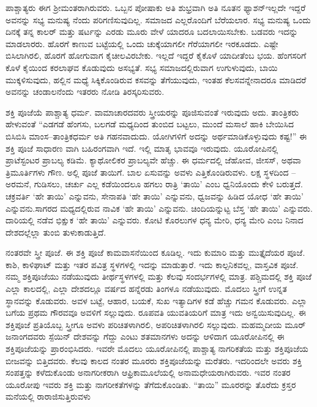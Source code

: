 ಪಾಶ್ಚಾತ್ಯರು ಈಗ ಶ‍್ರೀಮಂತರಾಗಿರುವರು. ಒಬ್ಬನ ಪೋಷಾಕು ಅತಿ ಶುಭ್ರವಾಗಿ ಅತಿ ನೂತನ ಫ್ಯಾಶನ್​ ಇಲ್ಲದೇ ಇದ್ದರೆ ಅವನನ್ನು ಸಭ್ಯ ಮನುಷ್ಯ ನೆಂದು ಪರಿಗಣಿಸುವುದಿಲ್ಲ. ಸಮಾಜದ ಎಲ್ಲರೊಂದಿಗೆ ಬೆರೆಯಲಾರ. ಸಭ್ಯ ಮನುಷ್ಯ ಒಂದು ದಿನಕ್ಕೆ ತನ್ನ ಕಾಲರ್​ ಮತ್ತು ಷರ್ಟನ್ನು ಎರಡು ಮೂರು ವೇಳೆ ಯಾದರೂ ಬದಲಾಯಿಸಬೇಕು. ಬಡವರು ಇದನ್ನು ಮಾಡಲಾರರು. ಹೊರಗೆ ಕಾಣುವ ಬಟ್ಟೆಯಲ್ಲಿ ಒಂದು ಚುಕ್ಕೆಯಾಗಲೀ ಗೆರೆ\break ಯಾಗಲೀ ಇರಕೂಡದು. ಎಷ್ಟೇ ಬಿಸಿಲಾಗಿರಲಿ, ಹೊರಗೆ ಹೋಗುವಾಗ ಕೈಚೀಲವಿರಬೇಕು. ಇಲ್ಲದೆ ಇದ್ದರೆ ಕೈಕೊಳೆ ಯಾದೀತೆಂಬ ಭಯ. ಹೆಂಗಸರಿಗೆ ಕೊಳೆ ಕೈಯಿಂದ ಕರಲಾಘವ ಕೊಡುವುದು ಅಸಭ್ಯತೆ. ಸಭ್ಯ ಸಮಾಜದಲ್ಲಿರುವಾಗ ಉಗುಳುವುದು, ಬಾಯಿ ಮುಕ್ಕಳಿಸು\break ವುದು, ಹಲ್ಲಿನ ಮಧ್ಯೆ ಸಿಕ್ಕಿಕೊಂಡಿರುವ ಕಸವನ್ನು ತೆಗೆಯುವುದು, ಇಂತಹ ಕೆಲಸವನ್ನೇ\break ನಾದರೂ ಮಾಡಿದರೆ ಅವನನ್ನು ಚಂಡಾಲನೆಂದು ಇತರರು ನೋಡಿ ತಿರಸ್ಕರಿಸುವರು.

ಶಕ್ತಿ ಪೂಜೆಯೆ ಪಾಶ್ಚಾತ್ಯ ಧರ್ಮ. ವಾಮಾಚಾರದವರು ಸ್ತ್ರೀಯರನ್ನು ಪೂಜಿಸುವಂತೆ ಇರುವುದು ಅದು. ತಾಂತ್ರಿಕರು ಹೇಳುವಂತೆ “ಎಡಗಡೆ ಹೆಂಗಸು, ಬಲಗಡೆ ಮಧ್ಯದಿಂದ ತುಂಬಿದ ಬಟ್ಟಲು, ಮುಂದೆ ಮಸಾಲೆ ಹಾಕಿ ಬೇಯಿಸಿದ ಬಿಸಿಬಿಸಿ ಮಾಂಸ–ತಾಂತ್ರಿಕಧರ್ಮ ಅತಿ ಗಹನವಾದುದು. ಯೋಗಿಗಳಿಗೆ ಅದನ್ನು ಅರ್ಥಮಾಡಿಕೊಳ್ಳುವುದು ಕಷ್ಟ!” ಈ ಶಕ್ತಿ ಪೂಜೆ ಸಾಧಾರಣ ವಾಗಿ ಬಹಿರಂಗವಾಗಿ ಇದೆ. ಇಲ್ಲಿ ಮಾತೃ ಭಾವವೂ ಇರುವುದು. ಯೂರೋಪಿನಲ್ಲಿ ಪ್ರಾಟೆಸ್ಟಂಟರ ಪ್ರಾಬಲ್ಯ ಕಡಿಮೆ. ಕ್ಯಾಥೋಲಿಕರ ಪ್ರಾಬಲ್ಯವೇ ಹೆಚ್ಚು. ಈ ಧರ್ಮದಲ್ಲಿ ಜೆಹೋವ, ಜೀಸಸ್​, ಅಥವಾ ತ್ರಿಮೂರ್ತಿಗಳು ಗೌಣ. ಅಲ್ಲಿ ಪೂಜೆ ತಾಯಿಗೆ. ಬಾಲ ಏಸುವನ್ನು ಅವಳು ಎತ್ತಿಕೊಂಡಿರುವಳು. ಲಕ್ಷ ಸ್ಥಳದಿಂದ – ಅರಮನೆ, ಗುಡಿಸಲು, ಚರ್ಚು ಎಲ್ಲ ಕಡೆಯಿಂದಲೂ ಹಗಲು ರಾತ್ರಿ ‘ತಾಯಿ’ ಎಂಬ ಧ್ವನಿಯೊಂದು ಕೇಳಿ ಬರುತ್ತದೆ. ಚಕ್ರವರ್ತಿ ‘ಹೇ ತಾಯಿ’ ಎನ್ನುವನು, ಸೇನಾಪತಿ ‘ಹೇ ತಾಯಿ’ ಎನ್ನುವನು, ಧ್ವಜವನ್ನು ಹಿಡಿದ ಯೋಧ ‘ಹೇ ತಾಯಿ’ ಎನ್ನುವನು.\break ಸಾಗರದ ಮಧ್ಯದಲ್ಲಿರುವ ನಾವಿಕ ‘ಹೇ ತಾಯಿ’ ಎನ್ನುವನು. ಚಿಂದಿಯನ್ನುಟ್ಟ ಬೆಸ್ತ `ಹೇ ತಾಯಿ’ ಎನ್ನುವರು. ದಾರಿಯಲ್ಲಿ ನಡೆವ ಭಿಕ್ಷುಕ `ಹೇ ತಾಯಿ’ ಎನ್ನುವರು. ಕೋಟಿ ಕೊರಲುಗಳ ಧನ್ಯ ಮೇರಿ, ಧನ್ಯ ಮೇರಿ ಎಂಬ ನಿನಾದ ದೇಶದಲ್ಲೆಲ್ಲಾ ತುಂಬಿ ತುಳುಕಾಡುತ್ತಿದೆ.

ನಂತರವೇ ಸ್ತ್ರೀ ಪೂಜೆ. ಈ ಶಕ್ತಿ ಪೂಜೆ ಕಾಮವಾಸನೆಯಿಂದ ಕೂಡಿಲ್ಲ. ಇದು ಕುಮಾರಿ ಮತ್ತು ಮುತ್ತೈದೆಯರ ಪೂಜೆ. ಕಾಶಿ, ಕಾಳಿಘಾಟ್​ ಮತ್ತು ಇತರ ಪವಿತ್ರ ಸ್ಥಳಗಳಲ್ಲಿ ಇದನ್ನು ಮಾಡುತ್ತಾರೆ. ಇದು ಕಾಲ್ಪನಿಕವಲ್ಲ, ವಾಸ್ತವಿಕ ಪೂಜೆ. ನಮ್ಮ ಶಕ್ತಿಪೂಜೆಯು ನಡೆಯುವುದು ತೀರ್ಥಸ್ಥಳಗಳಲ್ಲಿ ಮತ್ತು ಕೆಲವು ಸಂದರ್ಭಗಳಲ್ಲಿ ಮಾತ್ರ. ಪಶ್ಚಿಮದಲ್ಲಿ ಶಕ್ತಿ ಪೂಜೆ ಎಲ್ಲಾ ಕಾಲದಲ್ಲಿ, ಎಲ್ಲಾ ದೇಶದಲ್ಲೂ ವರ್ಷದ ಹನ್ನೆರಡು ತಿಂಗಳೂ ನಡೆಯುವುದು. ಮೊದಲು ಸ್ತ್ರೀಗೆ ಉನ್ನತ ಸ್ಥಾನವನ್ನು ಕೊಡುವರು. ಅವಳ ಬಟ್ಟೆ, ಆಹಾರ, ಬಯಕೆ, ಸುಖ ಇತ್ಯಾದಿಗಳ ಕಡೆ ಹೆಚ್ಚು ಗಮನ ಕೊಡುವರು. ಎಲ್ಲಾ ಬಗೆಯ ಪ್ರಥಮ ಗೌರವವೂ ಅವಳಿಗೆ ಸಲ್ಲುವುದು. ರೂಪವತಿ ಯುವತಿಯರಿಗೆ ಮಾತ್ರ ಇದು ಅನ್ವಯಿಸುವುದಿಲ್ಲ. ಈ ಶಕ್ತಿಪೂಜೆ ಪ್ರತಿಯೊಬ್ಬ ಸ್ತ್ರೀಗೂ ಅವಳು ಪರಿಚಿತಳಾಗಿರಲಿ, ಅಪರಿಚಿತಳಾಗಿರಲಿ ಸಲ್ಲುವುದು. ಮಹಮ್ಮದೀಯ ಮೂರ್​ ಜನಾಂಗದವರು ಸ್ಪೆಯಿನ್​ ದೇಶವನ್ನು ಗೆದ್ದು ಎಂಟು ಶತಮಾನಗಳು ಅದನ್ನು ಆಳಿದಾಗ ಯೂರೋಪಿನಲ್ಲಿ ಈ ಶಕ್ತಿಪೂಜೆಯನ್ನು ಪ್ರಾರಂಭಿಸಿದರು. ಇವರೇ ಮೊದಲು ಯೂರೋಪಿನಲ್ಲಿ ಪಾಶ್ಚಾತ್ಯ ನಾಗರಿಕತೆಯ ಮತ್ತು ಶಕ್ತಿಪೂಜೆಯ ಬೀಜವನ್ನು ಬಿತ್ತಿದವರು. ಕೆಲವು ಕಾಲದ ನಂತರ ಮೂರರು ಶಕ್ತಿಪೂಜೆಯನ್ನು ಮರೆತರು. ಇದರಿಂದಲೇ ಅವರು ಶಕ್ತಿ ಸಂಪತ್ತನ್ನು ಕಳೆದುಕೊಂಡು ಅನಾಗರೀಕರಾಗಿ ಆಫ್ರಿಕಾಮೂಲೆಯಲ್ಲಿ ಅನಾಮಧೇಯರಾಗಿರುವರು. ಇವರ ನಂತರ ಯೂರೋಪು ಇವರು ಶಕ್ತಿ ಮತ್ತು ನಾಗರೀಕತೆಗಳನ್ನು ತೆಗೆದುಕೊಂಡಿತು. “ತಾಯಿ” ಮೂರರನ್ನು ತೊರೆದು ಕ್ರಸ್ತರ ಮನೆಯಲ್ಲಿ ರಾರಾಜಿಸುತ್ತಿರುವಳು

